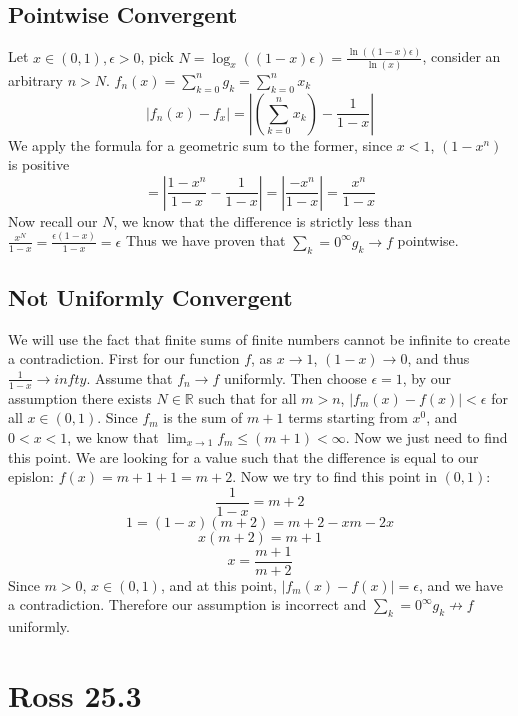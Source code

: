 \documentclass[12pt]{article}
\newcommand{\R}{\mathbb{R}}
\begin{document}
\subsection{Pointwise Convergent}
Let $x \in (0,1), \epsilon > 0$, pick $N = \log_x((1-x)\epsilon) = \frac{\ln((1-x)\epsilon)}{\ln(x)}$, consider an arbitrary $n > N$. $f_n(x) = \sum_{k=0}^n g_k =  \sum_{k=0}^n x_k$
$$|f_n(x)-f_x| = |(\sum_{k=0}^n x_k) - \frac{1}{1-x}|$$
We apply the formula for a geometric sum to the former, since $x<1$, $(1-x^n)$ is positive
$$= |\frac{1-x^n}{1-x} - \frac{1}{1-x}| = |\frac{-x^n}{1-x}| = \frac{x^n}{1-x}$$
Now recall our $N$, we know that the difference is strictly less than $\frac{x^N}{1-x} = \frac{\epsilon (1-x)}{1-x} = \epsilon$
\newline
Thus we have proven that $\sum_k=0^\infty g_k \to f$ pointwise.

\subsection{Not Uniformly Convergent}
We will use the fact that finite sums of finite numbers cannot be infinite to create a contradiction.
\newline
First for our function $f$, as $x \to 1$, $(1-x) \to 0$, and thus $\frac{1}{1-x} \to infty$. Assume that $f_n \to f$ uniformly. Then choose $\epsilon = 1$, by our assumption there exists $N \in \R$ such that for all $m > n$, $|f_m(x)-f(x)|<\epsilon$ for all $x \in (0,1)$.
\newline
Since $f_m$ is the sum of $m+1$ terms starting from $x^0$, and $0 < x < 1$, we know that $\lim_{x \to 1} f_m \leq (m+1) < \infty$. Now we just need to find this point.
\newline
We are looking for a value such that the difference is equal to our epislon: $f(x)=m+1+1 = m+2$. Now we try to find this point in $(0,1)$:
$$\frac{1}{1-x}=m+2$$
$$1 = (1-x)(m+2) = m +2 -xm -2x$$
$$x(m+2) = m+1$$
$$x = \frac{m+1}{m+2}$$
Since $m>0$, $x \in (0,1)$, and at this point, $|f_m(x)-f(x)|=\epsilon$, and we have a contradiction. Therefore our assumption is incorrect and $\sum_k=0^\infty g_k \not \to f$ uniformly.
\newpage


\section{Ross 25.3}
\end{document}
